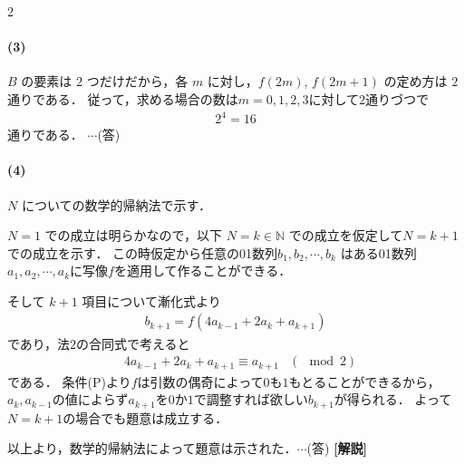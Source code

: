 \documentclass[../../main.tex]{subfiles}
\begin{document}
\begin{multicols}{2}
  \paragraph{(3)}
  $B$ の要素は $2$ つだけだから，各 $m$ に対し，$f(2m)$, $f(2m+1)$ の定め方は $2$ 通りである．
  従って，求める場合の数は$m=0,1,2,3$に対して$2$通りづつで
  \begin{align}
    2^4 = 16
  \end{align}
  通りである．  $\cdots$(答)

  \paragraph{(4)}
  $N$ についての数学的帰納法で示す．

  $N=1$ での成立は明らかなので，以下 $N=k \in \mathbb{N}$ での成立を仮定して$N=k+1$ での成立を示す．
  この時仮定から任意の01数列$b_{1},b_{2},\cdots, b_{k}$ はある01数列$a_{1},a_{2},\cdots, a_{k}$に写像$f$を適用して作ることができる．

  そして $k+1$ 項目について漸化式より
  \begin{align}
    b_{k+1} = f(4a_{k-1} + 2a_{k} + a_{k+1})
  \end{align}
  であり，法$2$の合同式で考えると
  \begin{align}
    & 4a_{k-1} + 2a_{k} + a_{k+1} \equiv a_{k+1} & (\mod 2)
  \end{align}
  である．
  条件(P)より$f$は引数の偶奇によって$0$も$1$もとることができるから，
  $a_{k}, a_{k-1}$の値によらず$a_{k+1}$を$0$か$1$で調整すれば欲しい$b_{k+1}$が得られる．
  よって$N=k+1$の場合でも題意は成立する．

  以上より，数学的帰納法によって題意は示された．$\cdots$(答)
  {\bf [解説]}

  \newpage
\end{multicols}
\end{document}
